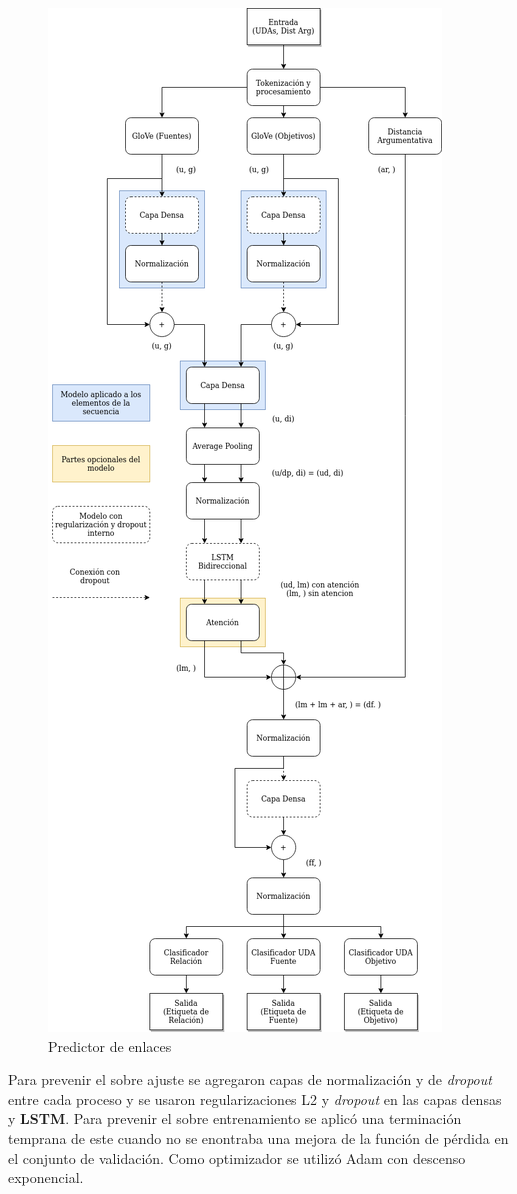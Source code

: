 \begin{figure}[h!]
	\begin{center}
		\begin{center}
			\includegraphics[scale=.3]{Graphics/Modelo_Link_Prediction.png}
        \end{center}
	    \caption{Predictor de enlaces}\label{fig:link_predictor}
	\end{center}
\end{figure}

Para prevenir el sobre ajuste se agregaron capas de normalización y de \emph{dropout} entre cada proceso y se usaron regularizaciones
L2 y \emph{dropout} en las capas densas y \textbf{LSTM}. Para prevenir el sobre entrenamiento se aplicó una 
terminación temprana de este cuando no se enontraba una mejora de la función de pérdida en el conjunto de validación.
Como optimizador se utilizó Adam con descenso exponencial.
